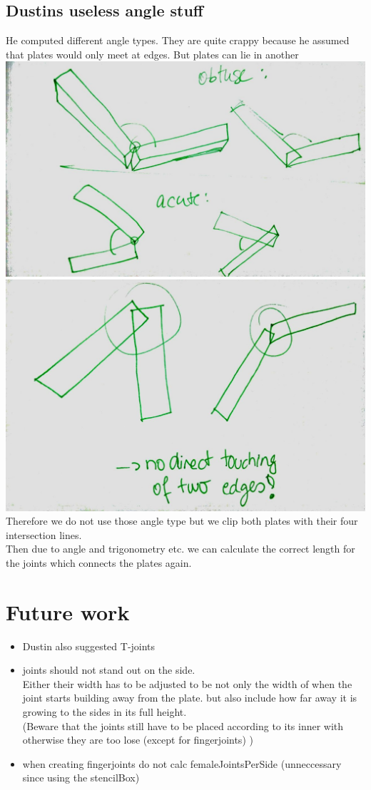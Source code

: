 \documentclass[../ClassicThesis.tex]{subfiles}
\begin{document}
\subsection{Dustins useless angle stuff}
He computed different angle types. They are quite crappy because he assumed that plates would only meet at edges. But plates can lie in another\\
\includegraphics[width=0.5\columnwidth]{Images/06-2-joints-angleTypesDustin.jpg}\\
\includegraphics[width=0.5\columnwidth]{Images/06-2-joints-angleTypesWrongAssumption.jpg}\\
Therefore we do not use those angle type but we clip both plates with their four intersection lines. \\
Then due to angle and trigonometry etc. we can calculate the correct length for the joints which connects the plates again.

    
    
    
\section{Future work}
    \begin{itemize}
        \item Dustin also suggested T-joints
        \item joints should not stand out on the side. \\
        Either their width has to be adjusted to be not only the width of when the joint starts building away from the plate. but also include how far away it is growing to the sides in its full height. \\
    (Beware that the joints still have to be placed according to its inner with otherwise they are too lose (except for fingerjoints) )
        \item when creating fingerjoints do not calc femaleJointsPerSide (unneccessary since using the stencilBox)
    \end{itemize}
\end{document}
